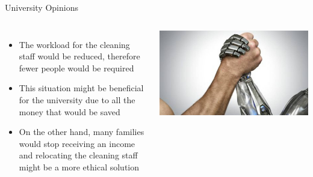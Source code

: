 \documentclass[18pt]{beamer}
\begin{document}
    \begin{frame}{University Opinions}
        \begin{columns}
            \begin{itemize}
                \item The workload for the cleaning staff would be reduced, therefore fewer people would be required
                \item This situation might be beneficial for the university due to all the money that would be saved
                \item On the other hand, many families would stop receiving an income and relocating the cleaning staff might be a more ethical solution
            \end{itemize}
            \includegraphics[width=0.99\columnwidth]{humanvsrobot}
        \end{columns}
    \end{frame}
\end{document}
